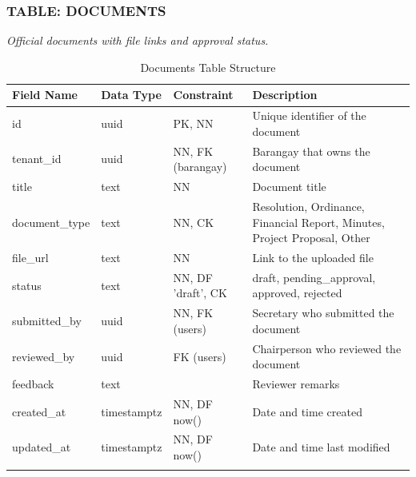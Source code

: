 \subsubsection*{TABLE: DOCUMENTS}
\noindent\textit{Official documents with file links and approval status.}
\begin{longtable}{|p{3.2cm}|p{2.2cm}|p{3.2cm}|p{5.4cm}|}
\hline
\textbf{Field Name} & \textbf{Data Type} & \textbf{Constraint} & \textbf{Description} \\ \hline
\endhead
\hline \endfoot
\hline \endlastfoot
id & uuid & PK, NN & Unique identifier of the document \\ \hline
tenant\_id & uuid & NN, FK (barangay) & Barangay that owns the document \\ \hline
title & text & NN & Document title \\ \hline
document\_type & text & NN, CK & Resolution, Ordinance, Financial Report, Minutes, Project Proposal, Other \\ \hline
file\_url & text & NN & Link to the uploaded file \\ \hline
status & text & NN, DF 'draft', CK & draft, pending\_approval, approved, rejected \\ \hline
submitted\_by & uuid & NN, FK (users) & Secretary who submitted the document \\ \hline
reviewed\_by & uuid & FK (users) & Chairperson who reviewed the document \\ \hline
feedback & text & & Reviewer remarks \\ \hline
created\_at & timestamptz & NN, DF now() & Date and time created \\ \hline
updated\_at & timestamptz & NN, DF now() & Date and time last modified \\ \hline
\caption{Documents Table Structure}
\label{tab:documents}
\end{longtable}
\vspace{3mm}

